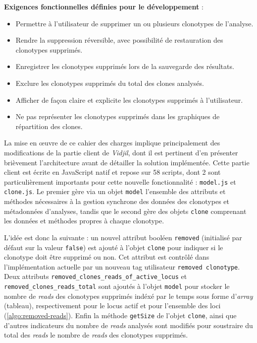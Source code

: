 \vspace{1em}

\textbf{Exigences fonctionnelles définies pour le développement} :
\begin{itemize}
    \item Permettre à l'utilisateur de supprimer un ou plusieurs clonotypes de l'analyse.
    \item Rendre la suppression réversible, avec possibilité de restauration des clonotypes supprimés.
    \item Enregistrer les clonotypes supprimés lors de la sauvegarde des résultats.
    \item Exclure les clonotypes supprimés du total des clones analysés.
    \item Afficher de façon claire et explicite les clonotypes supprimés à l'utilisateur.
    \item Ne pas représenter les clonotypes supprimés dans les graphiques de répartition des clones.
\end{itemize}

\vspace{1em}

La mise en œuvre de ce cahier des charges implique principalement des modifications de la partie client de \textit{Vidjil}, dont il est 
pertinent d'en présenter brièvement l'architecture avant de détailler la solution implémentée. Cette partie client est écrite en JavaScript natif 
et repose sur 58 scripts, dont 2 sont particulièrement importants pour cette nouvelle fonctionnalité : \texttt{model.js} et \texttt{clone.js}. 
Le premier gère via un objet \texttt{model} l'ensemble des attributs et méthodes nécessaires à la gestion synchrone des données des clonotypes 
et métadonnées d'analyses, tandis que le second gère des objets \texttt{clone} comprenant les données et méthodes propres à chaque clonotype. 

\vspace{1em}

L'idée est donc la suivante : un nouvel attribut booléen \texttt{removed} (initialisé par défaut sur la valeur \texttt{false}) est ajouté à l'objet 
\texttt{clone} pour indiquer si le clonotype doit être supprimé ou non. Cet attribut est contrôlé dans l'implémentation actuelle par un nouveau 
tag utilisateur \texttt{removed\ clonotype}. Deux attributs \texttt{removed\_clones\_reads\_of\_active\_locus} et \texttt{removed\_clones\_reads\_total} sont 
ajoutés à l'objet \texttt{model} pour stocker le nombre de \textit{reads} des clonotypes supprimés indéxé par le temps sous forme d'\textit{array} (tableau), 
respectivement pour le locus actif et pour l'ensemble des loci (\autoref{algo:removed-reads}). 
Enfin la méthode \texttt{getSize} de l'objet \texttt{clone}, ainsi que d'autres indicateurs du nombre de \textit{reads} analysés sont modifiés pour soustraire du 
total des \textit{reads} le nombre de \textit{reads} des clonotypes supprimés.

